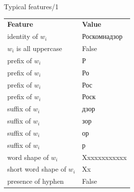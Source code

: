 \documentclass[10pt, compress]{beamer}
\begin{document}
\begin{frame}{Typical features/1}

\begin{tabular}{ll}
\textbf{Feature} & \textbf{Value} \\ 
identity of $w_i$  & Роскомнадзор \\
$w_i$ is all uppercase & False \\
prefix of $w_i$ & Р \\
prefix of $w_i$ & Ро \\
prefix of $w_i$ & Рос \\
prefix of $w_i$ & Роск \\
suffix of $w_i$ & дзор \\
suffix of $w_i$ & зор \\
suffix of $w_i$ & ор \\
suffix of $w_i$ & р \\
word shape of $w_i$ & Xxxxxxxxxxxx \\
short word shape of $w_i$ & Xx \\
presence of hyphen & False  \\

\end{tabular}

\end{frame}
\end{document}
